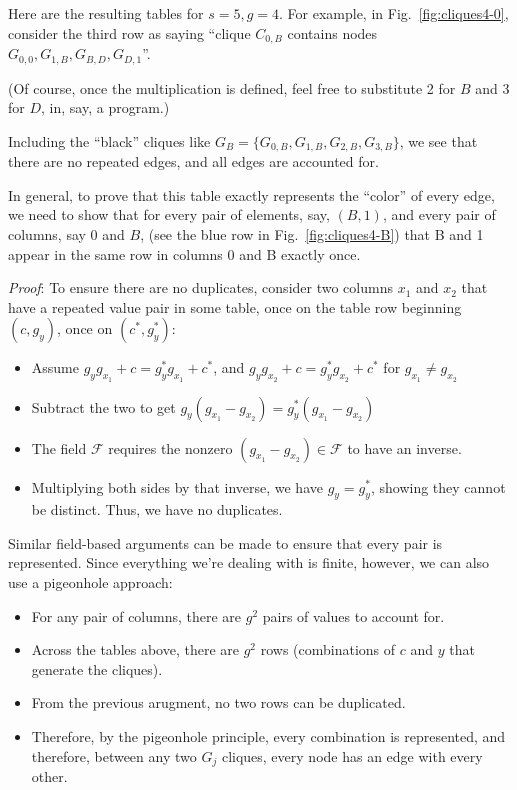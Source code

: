 \documentclass[11pt, oneside]{article} 	%
\begin{document}
Here are the resulting tables for $s=5, g=4$. For example, in Fig.~\ref{fig:cliques4-0}, consider the third row as saying ``clique $C_{0,B}$ contains nodes $G_{0,0}, G_{1,B}, G_{B,D}, G_{D,1}$''.


(Of course, once the multiplication is defined, feel free to substitute 2 for $B$ and 3 for $D$, in, say, a program.)


Including the ``black'' cliques like $G_B = \{G_{0,B}, G_{1,B}, G_{2,B}, G_{3,B}\}$, we see that there are no repeated edges, and all edges are accounted for. 

In general, to prove that this table exactly represents the ``color'' of every edge, we need to show that for every pair of elements, say, $(B, 1)$, and every pair of columns, say $0$ and $B$, (see the blue row in Fig.~\ref{fig:cliques4-B}) that B and 1 appear in the same row in columns 0 and B exactly once. 

\emph{Proof}:
To ensure there are no duplicates, consider two columns $x_1$ and $x_2$ that have a repeated value pair in some table, once on the table row beginning $(c, g_y)$, once on $(c^*, g_y^*)$:

\begin{itemize}
\item Assume $g_yg_{x_1} + c = g_y^*g_{x_1} +c^*$, and $g_yg_{x_2} + c = g_y^*g_{x_2} +c^*$ for $g_{x_1} \neq g_{x_2}$
\item Subtract the two to get $g_y(g_{x_1} - g_{x_2}) = g_y^*(g_{x_1} - g_{x_2})$
\item The field $\mathcal{F}$ requires the nonzero $(g_{x_1} - g_{x_2}) \in \mathcal{F}$ to have an inverse. 
\item Multiplying both sides by that inverse, we have $g_y = g_y^*$, showing they cannot be distinct. Thus, we have no duplicates.
\end{itemize}

Similar field-based arguments can be made to ensure that every pair is represented. Since everything we're dealing with is finite, however, we can also use a pigeonhole approach:
\begin{itemize}
\item For any pair of columns, there are $g^2$ pairs of values to account for.
\item Across the tables above, there are $g^2$ rows (combinations of $c$ and $y$ that generate the cliques).
\item From the previous arugment, no two rows can be duplicated.
\item Therefore, by the pigeonhole principle, every combination is represented, and therefore, between any two $G_j$ cliques, every node has an edge with every other.
\end{itemize}
\end{document}
